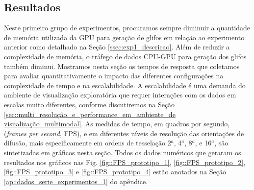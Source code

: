 
 
\subsection{Resultados}



Neste primeiro grupo de experimentos, procuramos sempre diminuir a quantidade de memória utilizada da GPU para geração de glifos em relação ao experimento anterior como detalhado na Seção \ref{ssec:exp1_descricao}. Além de reduzir a complexidade de memória, o tráfego de dados CPU-GPU para geração dos glifos também diminui. Mostramos nesta seção os tempos de resposta que coletamos para avaliar quantitativamente o impacto das diferentes configurações na complexidade de tempo e na escalabilidade. A escalabilidade é uma demanda do ambiente de visualização exploratória que requer interações com os dados em escalas muito diferentes, conforme discutiremos na Seção \ref{sec::multi_resolução_e_performance_em_ambiente_de visualização_multimodal}. As medidas de tempo, em quadros por segundo, (\textit{frames per second}, FPS), e em diferentes níveis de resolução das orientações de difusão, mais especificamente em ordens de tesselação 2$^a$, 4$^a$, 8$^a$, e 16$^a$, são sintetizadas em gráficos nesta seção.
Todos os dados numéricos que geraram os resultados nos gráficos nas Fig. \ref{fig::FPS_prototipo_1}, \ref{fig::FPS_prototipo_2}, \ref{fig::FPS_prototipo_3} e \ref{fig::FPS_prototipo_4} estão anotados na Seção \ref{ap::dados_serie_experimentos_1} do apêndice.

